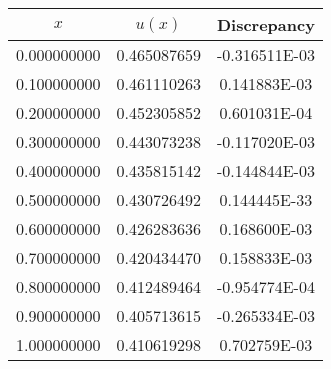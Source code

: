 \documentclass[12pt,a4paper]{article}
\begin{document}
\begin{center} 
\begin{tabular}{|c|c|c|}
\hline
         $x$    &     $u(x)$    &   Discrepancy \\
\hline
    0.000000000 & 0.465087659 & -0.316511E-03 \\
\hline    
    0.100000000 & 0.461110263 &  0.141883E-03 \\
\hline    
    0.200000000 & 0.452305852 &  0.601031E-04 \\
\hline    
    0.300000000 & 0.443073238 & -0.117020E-03 \\
\hline    
    0.400000000 & 0.435815142 & -0.144844E-03 \\
\hline    
    0.500000000 & 0.430726492 &  0.144445E-33 \\
\hline    
    0.600000000 & 0.426283636 &  0.168600E-03 \\
\hline    
    0.700000000 & 0.420434470 &  0.158833E-03 \\
\hline    
    0.800000000 & 0.412489464 & -0.954774E-04 \\
\hline    
    0.900000000 & 0.405713615 & -0.265334E-03 \\
\hline    
    1.000000000 & 0.410619298 &  0.702759E-03 \\
\hline
\end{tabular}
\end{center}
\end{document}
